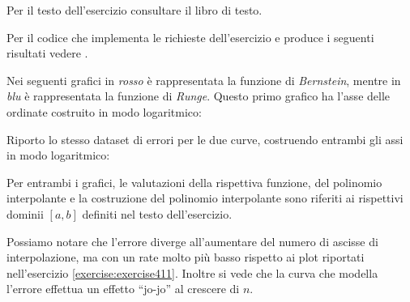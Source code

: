 \begin{exercise}[4.15]
Per il testo dell'esercizio consultare il libro di testo.
\end{exercise}
Per il codice che implementa le richieste dell'esercizio e produce i seguenti
risultati vedere .

Nei seguenti grafici in
\emph{rosso} \`e rappresentata la funzione di \emph{Bernstein}, mentre in 
\emph{blu} \`e rappresentata la funzione di \emph{Runge}. Questo primo grafico
ha l'asse delle ordinate costruito in modo logaritmico:
\begin{center}   

\end{center}
Riporto lo stesso dataset di errori per le due curve, costruendo entrambi gli
assi in modo logaritmico:
\begin{center}  

\end{center}
Per entrambi i grafici, le valutazioni della rispettiva funzione, del polinomio
interpolante e la costruzione del polinomio interpolante sono riferiti ai
rispettivi dominii $[a,b]$ definiti nel testo dell'esercizio. 

Possiamo notare che l'errore diverge all'aumentare del numero di ascisse di
interpolazione, ma con un rate molto pi\`u basso rispetto ai plot riportati
nell'esercizio \ref{exercise:exercise411}. Inoltre si vede che la curva
che modella l'errore effettua un effetto ``jo-jo'' al crescere di $n$.
